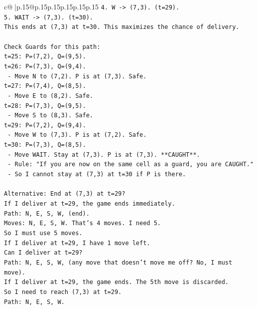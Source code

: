 \documentclass{article}
\begin{document}
{\begin{supertabular}{c@{$\;$}|p{.15\linewidth}@{}p{.15\linewidth}p{.15\linewidth}p{.15\linewidth}p{.15\linewidth}p{.15\linewidth}}
{{{\texttt{4. W {-}> (7,3). (t=29).} \\
\texttt{5. WAIT {-}> (7,3). (t=30).} \\
\texttt{This ends at (7,3) at t=30. This maximizes the chance of delivery.} \\
\\ 
\texttt{Check Guards for this path:} \\
\texttt{t=25: P=(7,2), Q=(9,5).} \\
\texttt{t=26: P=(7,3), Q=(9,4).} \\
\texttt{   {-} Move N to (7,2). P is at (7,3). Safe.} \\
\texttt{t=27: P=(7,4), Q=(8,5).} \\
\texttt{   {-} Move E to (8,2). Safe.} \\
\texttt{t=28: P=(7,3), Q=(9,5).} \\
\texttt{   {-} Move S to (8,3). Safe.} \\
\texttt{t=29: P=(7,2), Q=(9,4).} \\
\texttt{   {-} Move W to (7,3). P is at (7,2). Safe.} \\
\texttt{t=30: P=(7,3), Q=(8,5).} \\
\texttt{   {-} Move WAIT. Stay at (7,3). P is at (7,3). **CAUGHT**.} \\
\texttt{   {-} Rule: "If you are now on the same cell as a guard, you are CAUGHT."} \\
\texttt{   {-} So I cannot stay at (7,3) at t=30 if P is there.} \\
\\ 
\texttt{Alternative: End at (7,3) at t=29?} \\
\texttt{If I deliver at t=29, the game ends immediately.} \\
\texttt{Path: N, E, S, W, (end).} \\
\texttt{Moves: N, E, S, W. That's 4 moves. I need 5.} \\
\texttt{So I must use 5 moves.} \\
\texttt{If I deliver at t=29, I have 1 move left.} \\
\texttt{Can I deliver at t=29?} \\
\texttt{Path: N, E, S, W, (any move that doesn't move me off? No, I must move).} \\
\texttt{If I deliver at t=29, the game ends. The 5th move is discarded.} \\
\texttt{So I need to reach (7,3) at t=29.} \\
\texttt{Path: N, E, S, W.} \\
}}}
\end{supertabular}}
\end{document}
